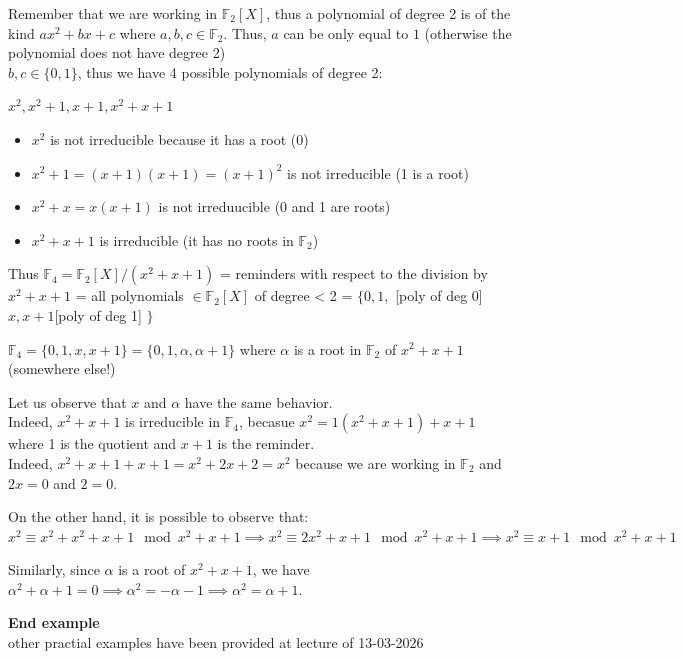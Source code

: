 \noindent
Remember that we are working in $\mathbb{F}_2[X]$, thus a polynomial of degree 2 is of the kind $ax^2 + bx + c$ where $a, b, c \in \mathbb{F}_2$.
\smallskip
\noindent
Thus, $a$ can be only equal to $1$ (otherwise the polynomial does not have degree 2)\\
$b, c \in \{0, 1\}$, thus we have 4 possible polynomials of degree 2:
\medskip

\noindent
$x^2, x^2 + 1, x + 1, x^2 + x + 1$
\begin{itemize}
    \item $x^2$ is not irreducible because it has a root (0)
    \item $x^2 + 1 = (x + 1)(x + 1) = (x + 1) ^2$ is not irreducible (1 is a root)
    \item $x^2 + x = x(x + 1)$ is not irreduucible (0 and 1 are roots)
    \item $x^2 + x + 1$ is irreducible (it has no roots in $\mathbb{F}_2$)
\end{itemize}

\medskip

\noindent
Thus $\mathbb{F}_4 = \mathbb{F}_2[X] / (x^2 + x + 1)$ = {reminders with respect to the division by $x^2 + x + 1$} = {all polynomials $\in \mathbb{F}_2[X]$ of degree < 2} = $\{ 0, 1,$ [poly of deg 0] $x, x+1 $[poly of deg 1] $\}$
\smallskip

\noindent
$\mathbb{F}_4 = \{ 0, 1, x, x+1 \} = \{ 0, 1, \alpha, \alpha+1 \}$ where $\alpha$ is a root in $\mathbb{F}_2$ of $x^2 + x + 1$ (somewhere else!)
\bigskip

\noindent
Let us observe that $x$ and $\alpha$ have the same behavior.\\
Indeed, $x^2 + x + 1$  is irreducible in $\mathbb{F}_4$, becasue $x^2 = 1(x^2+x+1) + x + 1$ where 1 is the quotient and $x + 1$ is the reminder.\\
Indeed, $x^2 + x + 1 + x + 1 = x^2 + 2x + 2 = x^2$ because we are working in $\mathbb{F}_2$ and $2x = 0$ and $2 = 0$.
\medskip

\noindent
On the other hand, it is possible to observe that:\\
$x^2 \equiv x^2 + x^2 + x + 1 \mod x^2+x+1 \implies x^2 \equiv 2x^2 + x + 1 \mod x^2 + x + 1 \implies x^2 \equiv x + 1 \mod x^2 + x+ 1$
\smallskip

\noindent
Similarly, since $\alpha$ is a root of $x^2 + x + 1$, we have $\alpha^2 + \alpha + 1 = 0 \implies \alpha^2 = - \alpha - 1 \implies \alpha^2 = \alpha + 1$.

\noindent
\textbf{End example}\\
other practial examples have been provided at lecture of 13-03-2026
\bigskip

